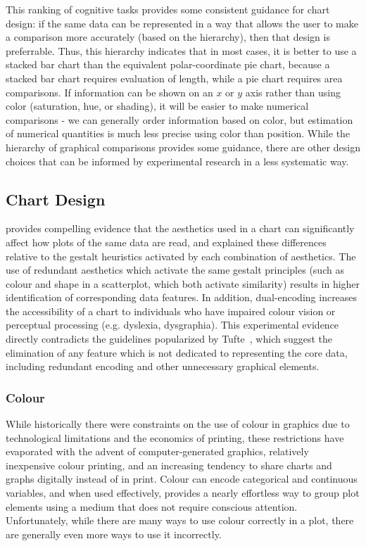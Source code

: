 \documentclass[letterpaper]{ar-1col}\usepackage[]{graphicx}\usepackage[]{color}
\begin{document}
This ranking of cognitive tasks provides some consistent guidance for chart design: if the same data can be represented in a way that allows the user to make a comparison more accurately (based on the hierarchy), then that design is preferrable. Thus, this hierarchy indicates that in most cases, it is better to use a stacked bar chart than the equivalent polar-coordinate pie chart, because a stacked bar chart requires evaluation of length, while a pie chart requires area comparisons. If information can be shown on an $x$ or $y$ axis rather than using color (saturation, hue, or shading), it will be easier to make numerical comparisons - we can generally order information based on color, but estimation of numerical quantities is much less precise using color than position. While the hierarchy of graphical comparisons provides some guidance, there are other design choices that can be informed by experimental research in a less systematic way.

\subsection{Chart Design}

\citet{vanderplasClustersBeatTrend2017} provides compelling evidence that the aesthetics used in a chart can significantly affect how plots of the same data are read, and explained these differences relative to the gestalt heuristics activated by each combination of aesthetics. The use of redundant aesthetics which activate the same gestalt principles (such as colour and shape in a scatterplot, which both activate similarity) results in higher identification of corresponding data features. In addition, dual-encoding increases the accessibility of a chart to individuals who have impaired colour vision or perceptual processing (e.g. dyslexia, dysgraphia). This experimental evidence directly contradicts the guidelines popularized by Tufte~\citeyear{tufte}, which suggest the elimination of any feature which is not dedicated to representing the core data, including redundant encoding and other unnecessary graphical elements.

\subsubsection{Colour}
While historically there were constraints on the use of colour in graphics due to technological limitations and the economics of printing, these restrictions have evaporated with the advent of computer-generated graphics, relatively inexpensive colour printing, and an increasing tendency to share charts and graphs digitally instead of in print. Colour can encode categorical and continuous variables, and when used effectively, provides a nearly effortless way to group plot elements using a medium that does not require conscious attention. Unfortunately, while there are many ways to use colour correctly in a plot, there are generally even more ways to use it incorrectly.
\end{document}
